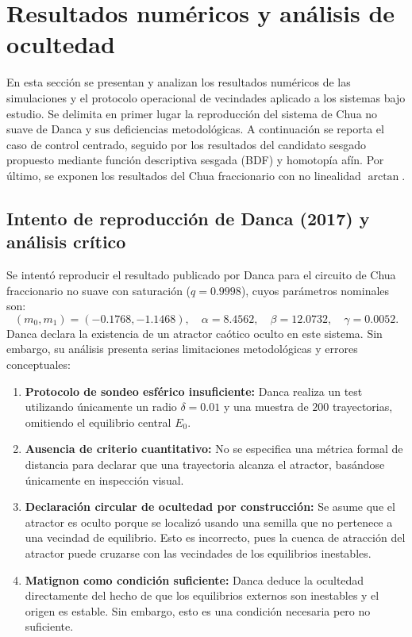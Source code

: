 \section{Resultados numéricos y análisis de ocultedad}
\label{sec:resultados_numericos}

En esta sección se presentan y analizan los resultados numéricos de las simulaciones y el protocolo operacional de vecindades aplicado a los sistemas bajo estudio. Se delimita en primer lugar la reproducción del sistema de Chua no suave de Danca \cite{Danca2017} y sus deficiencias metodológicas. A continuación se reporta el caso de control centrado, seguido por los resultados del candidato sesgado propuesto mediante función descriptiva sesgada (BDF) y homotopía afín. Por último, se exponen los resultados del Chua fraccionario con no linealidad $\arctan$.

\subsection{Intento de reproducción de Danca (2017) y análisis crítico}
\label{subsec:resultados_danca_exactos}

Se intentó reproducir el resultado publicado por Danca \cite{Danca2017} para el circuito de Chua fraccionario no suave con saturación ($q=0.9998$), cuyos parámetros nominales son:
\[
(m_0,m_1)=(-0.1768,-1.1468), \quad \alpha=8.4562, \quad \beta=12.0732, \quad \gamma=0.0052.
\]
Danca \cite{Danca2017} declara la existencia de un atractor caótico oculto en este sistema. Sin embargo, su análisis presenta serias limitaciones metodológicas y errores conceptuales:
\begin{enumerate}
    \item \textbf{Protocolo de sondeo esférico insuficiente:} Danca realiza un test utilizando únicamente un radio $\delta = 0.01$ y una muestra de $200$ trayectorias, omitiendo el equilibrio central $E_0$.
    \item \textbf{Ausencia de criterio cuantitativo:} No se especifica una métrica formal de distancia para declarar que una trayectoria alcanza el atractor, basándose únicamente en inspección visual.
    \item \textbf{Declaración circular de ocultedad por construcción:} Se asume que el atractor es oculto porque se localizó usando una semilla que no pertenece a una vecindad de equilibrio. Esto es incorrecto, pues la cuenca de atracción del atractor puede cruzarse con las vecindades de los equilibrios inestables.
    \item \textbf{Matignon como condición suficiente:} Danca deduce la ocultedad directamente del hecho de que los equilibrios externos son inestables y el origen es estable. Sin embargo, esto es una condición necesaria pero no suficiente.
\end{enumerate}

